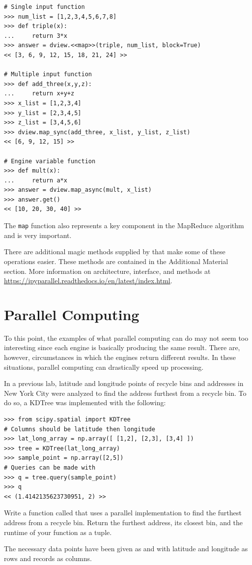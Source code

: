 \begin{lstlisting}
# Single input function
>>> num_list = [1,2,3,4,5,6,7,8]
>>> def triple(x):
...     return 3*x
>>> answer = dview.<<map>>(triple, num_list, block=True)
<< [3, 6, 9, 12, 15, 18, 21, 24] >>

# Multiple input function
>>> def add_three(x,y,z):
...     return x+y+z
>>> x_list = [1,2,3,4]
>>> y_list = [2,3,4,5]
>>> z_list = [3,4,5,6]
>>> dview.map_sync(add_three, x_list, y_list, z_list)
<< [6, 9, 12, 15] >>

# Engine variable function
>>> def mult(x):
...		return a*x
>>> answer = dview.map_async(mult, x_list)
>>> answer.get()
<< [10, 20, 30, 40] >>
\end{lstlisting}

The \texttt{map} function also represents a key component in the MapReduce algorithm and is very important.

There are additional magic methods supplied by  that make some of these operations easier.
These methods are contained in the Additional Material section.
More information on  architecture, interface, and methods at \url{https://ipyparallel.readthedocs.io/en/latest/index.html}.


\section*{Parallel Computing}
To this point, the examples of what parallel computing can do may not seem too interesting since each engine is basically producing the same result.
There are, however, circumstances in which the engines return different results.
In these situations, parallel computing can drastically speed up processing.

\begin{problem}
In a previous lab, latitude and longitude points of recycle bins and addresses in New York City were analyzed to find the address furthest from a recycle bin.
To do so, a KDTree was implemented with the following:

\begin{lstlisting}
>>> from scipy.spatial import KDTree
# Columns should be latitude then longitude
>>> lat_long_array = np.array([ [1,2], [2,3], [3,4] ])
>>> tree = KDTree(lat_long_array)
>>> sample_point = np.array([2,5])
# Queries can be made with
>>> q = tree.query(sample_point)
>>> q
<< (1.4142135623730951, 2) >>
\end{lstlisting}

Write a function called  that uses a parallel implementation to find the furthest address from a recycle bin.
Return the furthest address, its closest bin, and the runtime of your function as a tuple.

The necessary data points have been given as  and  with latitude and longitude as rows and records as columns.
\end{problem}

